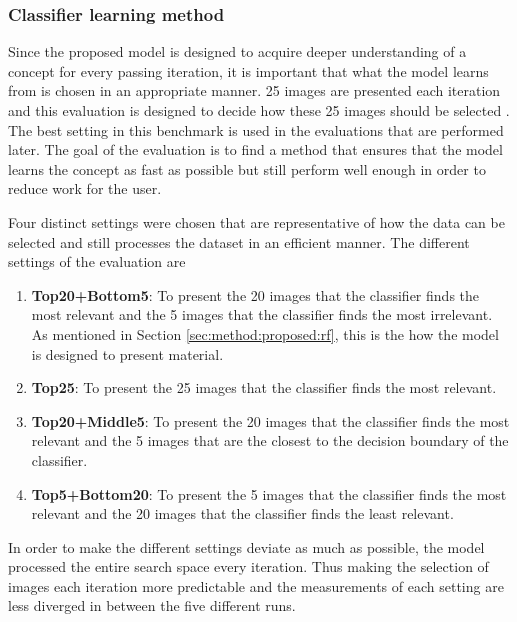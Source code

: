 \subsubsection{Classifier learning method}
\label{sec:method:eval:param:learning}
Since the proposed model is designed to acquire deeper understanding of a concept for every passing iteration, it is important that what the model learns from is chosen in an appropriate manner. 25 images are presented each iteration and this evaluation is designed to decide how these 25 images should be selected . The best setting in this benchmark is used in the evaluations that are performed later. 
The goal of the evaluation is to find a method that ensures that the model learns the concept as fast as possible but still perform well enough in order to reduce work for the user. 

Four distinct settings were chosen that are representative of how the data can be selected and still processes the dataset in an efficient manner. The different settings of the evaluation are
\begin{enumerate}
	\item \textbf{Top20+Bottom5}: To present the 20 images that the classifier finds the most relevant and the 5 images that the classifier finds the most irrelevant. As mentioned in Section \ref{sec:method:proposed:rf}, this is the how the model is designed to present material.  
	\item \textbf{Top25}: To present the 25 images that the classifier finds the most relevant. 
	\item \textbf{Top20+Middle5}: To present the 20 images that the classifier finds the most relevant and the 5 images that are the closest to the decision boundary of the classifier. 
	\item \textbf{Top5+Bottom20}: To present the 5 images that the classifier finds the most relevant and the 20 images that the classifier finds the least relevant. 
\end{enumerate}
In order to make the different settings deviate as much as possible, the model processed the entire search space every iteration. Thus making the selection of images each iteration more predictable and the measurements of each setting are less diverged in between the five different runs.

